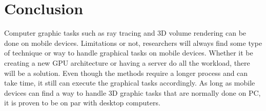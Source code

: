 \documentclass{article}
\begin{document}
\section{Conclusion}
   Computer graphic tasks such as ray tracing and 3D volume rendering can be done on mobile devices. Limitations or not, researchers will always find some type of technique or way to handle graphical tasks on mobile devices. Whether it be creating a new GPU architecture or having a server do all the workload, there will be a solution. Even though the methods require a longer process and can take time, it still can execute the graphical tasks accordingly. As long as mobile devices can find a way to handle 3D graphic tasks that are normally done on PC, it is proven to be on par with desktop computers.
   


\end{document}
